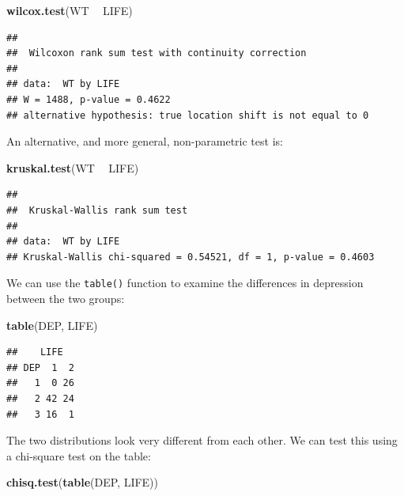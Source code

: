\documentclass[12pt,]{book}
\newenvironment{Shaded}{\begin{snugshade}}{\end{snugshade}}
\newcommand{\KeywordTok}[1]{\textcolor[rgb]{0.13,0.29,0.53}{\textbf{#1}}}
\newcommand{\StringTok}[1]{\textcolor[rgb]{0.31,0.60,0.02}{#1}}
\newcommand{\OperatorTok}[1]{\textcolor[rgb]{0.81,0.36,0.00}{\textbf{#1}}}
\newcommand{\NormalTok}[1]{#1}
\theoremstyle{definition}
\theoremstyle{definition}
\theoremstyle{definition}
\theoremstyle{remark}
\begin{document}
\begin{Shaded}
\begin{Highlighting}[]
\KeywordTok{wilcox.test}\NormalTok{(WT }\OperatorTok{~}\StringTok{ }\NormalTok{LIFE)}
\end{Highlighting}
\end{Shaded}

\begin{verbatim}
## 
##  Wilcoxon rank sum test with continuity correction
## 
## data:  WT by LIFE
## W = 1488, p-value = 0.4622
## alternative hypothesis: true location shift is not equal to 0
\end{verbatim}

An alternative, and more general, non-parametric test is:

\begin{Shaded}
\begin{Highlighting}[]
\KeywordTok{kruskal.test}\NormalTok{(WT }\OperatorTok{~}\StringTok{ }\NormalTok{LIFE)}
\end{Highlighting}
\end{Shaded}

\begin{verbatim}
## 
##  Kruskal-Wallis rank sum test
## 
## data:  WT by LIFE
## Kruskal-Wallis chi-squared = 0.54521, df = 1, p-value = 0.4603
\end{verbatim}

We can use the \texttt{table()} function to examine the differences in
depression between the two groups:

\begin{Shaded}
\begin{Highlighting}[]
\KeywordTok{table}\NormalTok{(DEP, LIFE)}
\end{Highlighting}
\end{Shaded}

\begin{verbatim}
##    LIFE
## DEP  1  2
##   1  0 26
##   2 42 24
##   3 16  1
\end{verbatim}

The two distributions look very different from each other. We can test
this using a chi-square test on the table:

\begin{Shaded}
\begin{Highlighting}[]
\KeywordTok{chisq.test}\NormalTok{(}\KeywordTok{table}\NormalTok{(DEP, LIFE))}
\end{Highlighting}
\end{Shaded}
\end{document}
